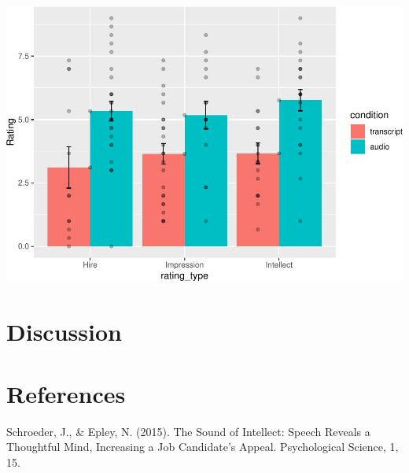 \documentclass[
  english,
  man]{apa6}
\begin{document}
\includegraphics{semester-project.csf_files/figure-latex/unnamed-chunk-5-1.pdf}

\hypertarget{discussion}{%
\section{Discussion}\label{discussion}}

\newpage

\hypertarget{references}{%
\section{References}\label{references}}

Schroeder, J., \& Epley, N. (2015). The Sound of Intellect: Speech Reveals a Thoughtful Mind, Increasing a Job Candidate's Appeal. Psychological Science, 1, 15.

\begingroup
\setlength{\parindent}{-0.5in}
\setlength{\leftskip}{0.5in}
\end{document}
